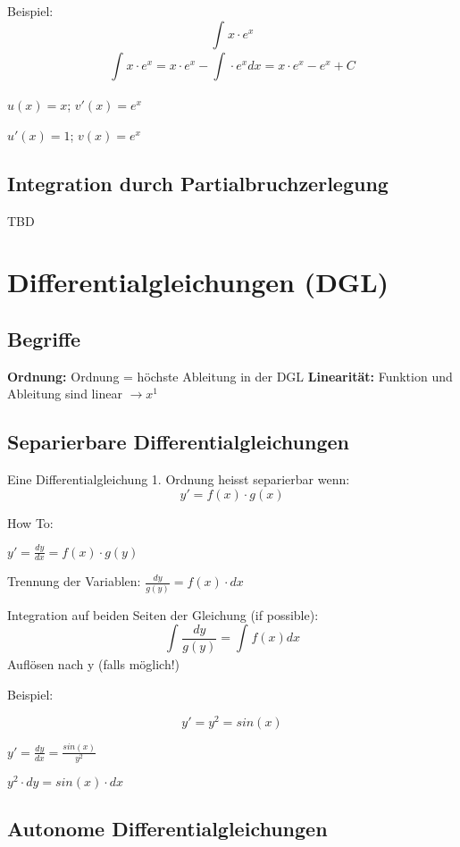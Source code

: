 \begin{multicols*}{3}
\begin{multicols}{2}
{Beispiel:}
 \[ \int_{}{}x\cdot e^x\]
$$ \int_{}{}x\cdot e^x = x\cdot e^x -  \int_{}{}\cdot e^x dx = x\cdot e^x - e^x + C $$
\columnbreak
 
{$u(x)=x$; $v'(x)=e^x$}

{$u'(x)=1$; $v(x)=e^x$}

\end{multicols}





\subsection{Integration durch Partialbruchzerlegung}
{TBD}

\section{Differentialgleichungen (DGL)}
\subsection{Begriffe}
{\textbf{Ordnung:} Ordnung = höchste Ableitung in der DGL}
{\textbf{Linearität:} Funktion und Ableitung sind linear $\rightarrow x^1$ }

\subsection{Separierbare Differentialgleichungen}
{Eine Differentialgleichung 1. Ordnung heisst separierbar wenn:}
$$ y' = f(x)\cdot g(x)$$

{How To:}

 $y' = \frac{dy}{dx} = f(x)\cdot g(y) $

 {Trennung der Variablen:} $\frac{dy}{g(y)} = f(x)\cdot dx$

 {Integration auf beiden Seiten der Gleichung (if possible):} $$\int_{}^{}{\frac{dy}{g(y)}=\int_{}^{}f(x)dx}$$
 {Auflösen nach y (falls möglich!)}

\begin{multicols}{2}
{Beispiel:}

$$y' = y^2 = sin(x)$$

 $y' = \frac{dy}{dx}=\frac{sin(x)}{y^2}$

 $y^2\cdot dy = sin(x)\cdot dx $
\columnbreak
 


\end{multicols}



\subsection{Autonome Differentialgleichungen}


\WhiteSpace

\mbox{}
	
\end{multicols*} 


